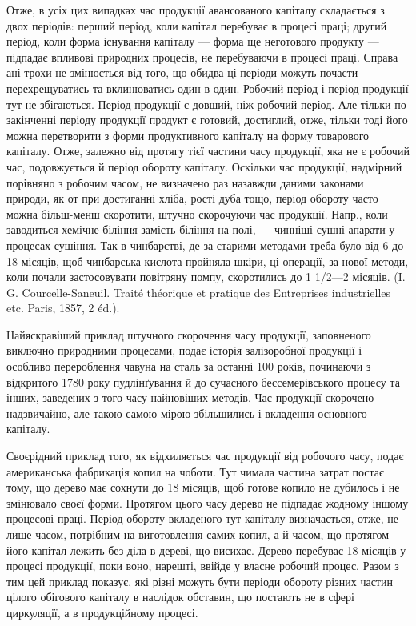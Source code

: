 Отже, в усіх цих випадках час продукції авансованого капіталу складається
з двох періодів: перший період, коли капітал перебуває в процесі
праці; другий період, коли форма існування капіталу — форма ще неготового
продукту — підпадає впливові природних процесів, не перебуваючи
в процесі праці. Справа ані трохи не змінюється від того, що обидва ці
періоди можуть почасти перехрещуватись та вклинюватись один в один.
Робочий період і період продукції тут не збігаються. Період продукції
є довший, ніж робочий період. Але тільки по закінченні періоду продукції
продукт є готовий, достиглий, отже, тільки тоді його можна перетворити
з форми продуктивного капіталу на форму товарового капіталу.
Отже, залежно від протягу тієї частини часу продукції, яка не є
робочий час, подовжується й період обороту капіталу. Оскільки час продукції,
надмірний порівняно з робочим часом, не визначено раз назавжди
даними законами природи, як от при достиганні хліба, рості дуба тощо,
період обороту часто можна більш-менш скоротити, штучно скорочуючи
час продукції. Напр., коли заводиться хемічне біління замість біління
на полі, — чинніші сушні апарати у процесах сушіння. Так в чинбарстві,
де за старими методами треба було від 6 до 18 місяців, щоб
чинбарська кислота пройняла шкіри, ці операції, за нової методи, коли
почали застосовувати повітряну помпу, скоротились до 1 1/2—2 місяців.
(I. G. Courcelle-Saneuil. Traité théorique et pratique des Entreprises industrielles
etc. Paris, 1857, 2 éd.).

Найяскравіший приклад штучного скорочення часу продукції, заповненого
виключно природними процесами, подає історія залізоробної
продукції і особливо перероблення чавуна на сталь за останні 100 років,
починаючи з відкритого 1780 року пудлінґування й до сучасного бессемерівського
процесу та інших, заведених з того часу найновіших методів.
Час продукції скорочено надзвичайно, але такою самою мірою збільшились
і вкладення основного капіталу.

Своєрідний приклад того, як відхиляється час продукції від робочого
часу, подає американська фабрикація копил на чоботи. Тут чимала частина
затрат постає тому, що дерево має сохнути до 18 місяців, щоб
готове копило не дубилось і не змінювало своєї форми. Протягом цього
часу дерево не підпадає жодному іншому процесові праці. Період обороту
вкладеного тут капіталу визначається, отже, не лише часом, потрібним
на виготовлення самих копил, а й часом, що протягом його капітал
лежить без діла в дереві, що висихає. Дерево перебуває 18 місяців
у процесі продукції, поки воно, нарешті, ввійде у власне робочий процес.
Разом з тим цей приклад показує, які різні можуть бути періоди обороту
різних частин цілого обігового капіталу в наслідок обставин, що постають
не в сфері циркуляції, а в продукційному процесі.

